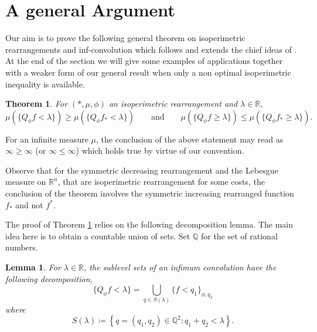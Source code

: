 \documentclass[11pt]{article}
\newtheorem{theorem}[conjecture]{Theorem}
\newtheorem{lemma}[conjecture]{Lemma}
\newcommand{\1}{[1]}
\begin{document}
\section{A general Argument} \label{sec:general}

Our aim is to prove the following general theorem on isoperimetric rearrangements and inf-convolution which follows and extends the chief ideas of \cite{melbourne2019rearrangement}.
At the end of the section we will give some examples of applications together with a weaker form of our general result when only a non optimal isoperimetric inequality is available.

\begin{theorem} \label{th:isoperimetric-rearrangeement}
    For $(*, \mu, \phi)$ an isoperimetric rearrangement and $\lambda \in \mathbb{R}$,
    \[
        \mu (\{ Q_\phi f < \lambda \}) \geq \mu (\{ Q_\phi f_* < \lambda \}) %
   \qquad \mbox{and} \qquad 
        \mu (\{ Q_\phi f \geq \lambda \}) 
        \leq \mu (\{ Q_\phi f_* \geq \lambda \}) .
    \]
\end{theorem}

For an infinite measure $\mu$, the conclusion of the above statement may read as $\infty \geq \infty$ (or $\infty \leq \infty$) which holds true by virtue of our convention. 

Observe that for the symmetric decreasing rearrangement and the Lebesgue measure on $\mathbb{R}^n$, that are isoperimetric rearrangement for some costs, the conclusion of the theorem involves the symmetric increasing rearranged function $f_*$ and not $f^*$.

The proof of Theorem \ref{th:isoperimetric-rearrangeement}
relies on the following decomposition lemma. The main idea here is to obtain a countable union of sets. Set $\mathbb{Q}$ for the set of rational numbers.

\begin{lemma} \label{lem: decomposition}
    For $\lambda \in \mathbb{R}$, the sublevel sets of an infimum convolution have the following decomposition,
    \[
        \{ Q_\phi f < \lambda \} = \bigcup_{q \in S(\lambda)} \{ f < q_1 \}_{\phi,q_2}
    \]
    where
    \[
        S(\lambda) \coloneqq \left\{ q=(q_1,q_2) \in \mathbb{Q}^2 : q_1 + q_2 < \lambda \right\}.
    \]
\end{lemma}
\end{document}
